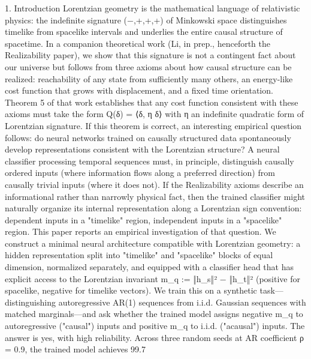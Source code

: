 1. Introduction
Lorentzian geometry is the mathematical language of relativistic physics: the indefinite signature (−,+,+,+) of Minkowski space distinguishes timelike from spacelike intervals and underlies the entire causal structure of spacetime. In a companion theoretical work (Li, in prep., henceforth the Realizability paper), we show that this signature is not a contingent fact about our universe but follows from three axioms about how causal structure can be realized: reachability of any state from sufficiently many others, an energy-like cost function that grows with displacement, and a fixed time orientation. Theorem 5 of that work establishes that any cost function consistent with these axioms must take the form Q(δ) = ⟨δ, η δ⟩ with η an indefinite quadratic form of Lorentzian signature.
If this theorem is correct, an interesting empirical question follows: do neural networks trained on causally structured data spontaneously develop representations consistent with the Lorentzian structure? A neural classifier processing temporal sequences must, in principle, distinguish causally ordered inputs (where information flows along a preferred direction) from causally trivial inputs (where it does not). If the Realizability axioms describe an informational rather than narrowly physical fact, then the trained classifier might naturally organize its internal representation along a Lorentzian sign convention: dependent inputs in a "timelike" region, independent inputs in a "spacelike" region.
This paper reports an empirical investigation of that question. We construct a minimal neural architecture compatible with Lorentzian geometry: a hidden representation split into "timelike" and "spacelike" blocks of equal dimension, normalized separately, and equipped with a classifier head that has explicit access to the Lorentzian invariant m_q := ‖h_s‖² − ‖h_t‖² (positive for spacelike, negative for timelike vectors). We train this on a synthetic task—distinguishing autoregressive AR(1) sequences from i.i.d. Gaussian sequences with matched marginals—and ask whether the trained model assigns negative m_q to autoregressive ("causal") inputs and positive m_q to i.i.d. ("acausal") inputs.
The answer is yes, with high reliability. Across three random seeds at AR coefficient ρ = 0.9, the trained model achieves 99.7%
